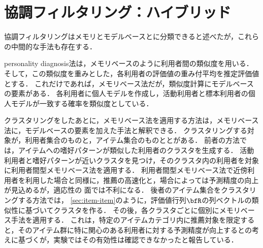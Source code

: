 \chapter{協調フィルタリング：ハイブリッド}
\label{chap:hybridcf}

協調フィルタリングはメモリとモデルベースとに分類できると述べたが，これらの中間的な手法も存在する．

personality diagnosis法\cite{uai:00:01}は，メモリベースのように利用者間の類似度を用いる．
そして，この類似度を重みとした，各利用者の評価値の重み付平均を推定評価値とする．
これだけであれば，メモリベース法だが，類似度計算にモデルベースの要素がある．
各利用者に個人モデルを作成し，活動利用者と標本利用者の個人モデルが一致する確率を類似度としている．

クラスタリングをしたあとに，メモリベース法を適用する方法は，メモリベース法に，モデルベースの要素を加えた手法と解釈できる．
クラスタリングする対象が，利用者集合のもの\cite{sigir:05:01}と，アイテム集合のものと\cite{misc:090}とがある．
前者の方法では，アイテムへの嗜好パターンが類似した利用者のクラスタを生成する．
活動利用者と嗜好パターンが近いクラスタを見つけ，そのクラスタ内の利用者を対象に利用者間型メモリベース法を適用する．
利用者間型メモリベース法で近傍利用者を利用した場合と同様に，推薦の高速化と，場合によっては予測精度の向上が見込めるが，適応性の
面では不利になる．
後者のアイテム集合をクラスタリングする方法では，
\ref{sec:item-item}のように，評価値行列$\bfR$の列ベクトルの類似性に基づいてクラスタを作る．
その後，各クラスタごとに個別にメモリベース手法を適用する．
これは，特定のアイテムカテゴリ内に推薦対象を限定すると，そのアイテム群に特に関心のある利用者に対する予測精度が向上するとの考えに基づくが，実験ではその有効性は確認できなかったと報告している．

